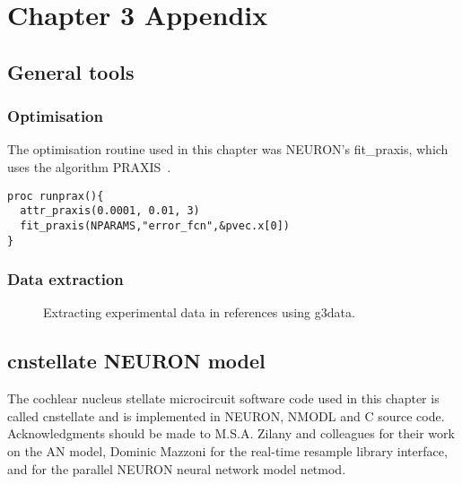 
\section{Chapter 3 Appendix}\label{sec:ch3:appendix}

\subsection{General tools}

\subsubsection{Optimisation}

The optimisation routine used in this chapter was NEURON's \textsf{fit\_praxis},
which uses the algorithm PRAXIS~\citep{Brent:1976}.

\begin{lstlisting}[label=lbl:runprax,caption=Set optimisation attributes and run
  fitting procedure.]
proc runprax(){
  attr_praxis(0.0001, 0.01, 3)
  fit_praxis(NPARAMS,"error_fcn",&pvec.x[0])
}
\end{lstlisting}


\subsubsection{Data extraction}


 \begin{figure}[htb]
 \begin{center}
 \caption{Extracting experimental data in references using g3data.}
 \label{fig:Extractdata}
 \end{center}
 \end{figure}


\subsection{\textsf{cnstellate} NEURON model}

The cochlear nucleus stellate microcircuit software code used in this chapter is
called \textsf{cnstellate} and is implemented in NEURON, NMODL and C source
code. Acknowledgments should be made to M.S.A. Zilany and colleagues for their
work on the AN model, Dominic Mazzoni for the real-time resample library
interface, and \citet{MiglioreCanniaEtAl:2006} for the parallel NEURON
neural network model \textsf{netmod}.

